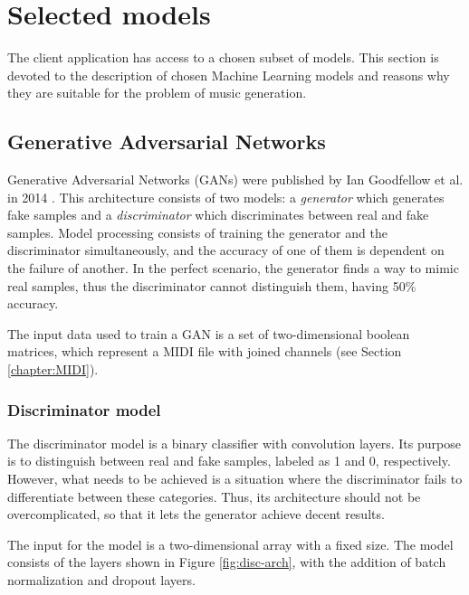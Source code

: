 \documentclass[a4paper, 11pt, twoside]{report}
\theoremstyle{definition}
\begin{document}
\chapter{Selected models}

The client application has access to a chosen subset of models. This section is devoted to the description of chosen Machine Learning models and reasons why they are suitable for the problem of music generation. \par


\section{Generative Adversarial Networks}

Generative Adversarial Networks (GANs) were published by Ian Goodfellow et al. in 2014 \cite{GAN_arxiv}. This architecture consists of two models: a \textit{generator} which generates fake samples and a \textit{discriminator} which discriminates between real and fake samples. Model processing consists of training the generator and the discriminator simultaneously, and the accuracy of one of them is dependent on the failure of another. In the perfect scenario, the generator finds a way to mimic real samples, thus the discriminator cannot distinguish them, having 50\% accuracy. \par
The input data used to train a GAN is a set of two-dimensional boolean matrices, which represent a MIDI file with joined channels (see Section \ref{chapter:MIDI}). \par

\subsection{Discriminator model}
The discriminator model is a binary classifier with convolution layers. Its purpose is to distinguish between real and fake samples, labeled as 1 and 0, respectively. However, what needs to be achieved is a situation where the discriminator fails to differentiate between these categories. Thus, its architecture should not be overcomplicated, so that it lets the generator achieve decent results. \par
The input for the model is a two-dimensional array with a fixed size. The model consists of the layers shown in Figure \ref{fig:disc-arch}, with the addition of batch normalization and dropout layers. \par
\end{document}
